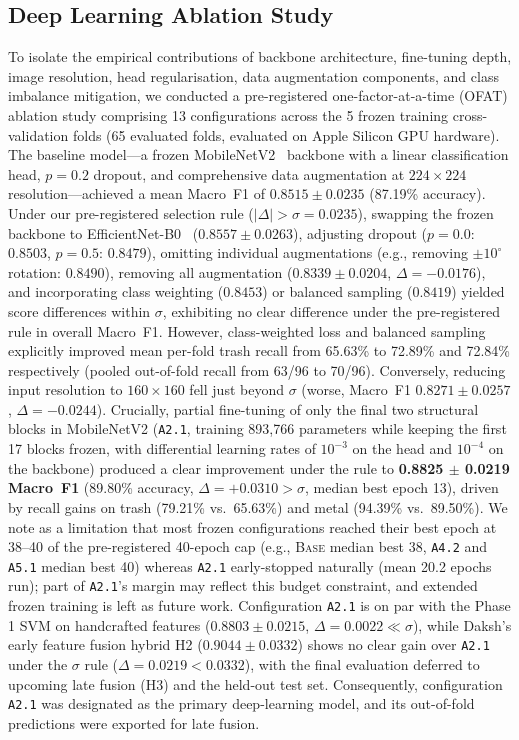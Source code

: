 \subsection{Deep Learning Ablation Study}
\label{sec:dl_ablations}
To isolate the empirical contributions of backbone architecture, fine-tuning depth, image resolution, head regularisation, data augmentation components, and class imbalance mitigation, we conducted a pre-registered one-factor-at-a-time (OFAT) ablation study comprising 13 configurations across the 5 frozen training cross-validation folds (65 evaluated folds, evaluated on Apple Silicon GPU hardware).
The baseline model---a frozen MobileNetV2~\cite{sandler2018mobilenetv2} backbone with a linear classification head, $p=0.2$ dropout, and comprehensive data augmentation at $224 \times 224$ resolution---achieved a mean Macro~F1 of $0.8515 \pm 0.0235$ (87.19\% accuracy).
Under our pre-registered selection rule ($|\Delta| > \sigma = 0.0235$), swapping the frozen backbone to EfficientNet-B0~\cite{tan2019efficientnet} ($0.8557 \pm 0.0263$), adjusting dropout ($p=0.0$: $0.8503$, $p=0.5$: $0.8479$), omitting individual augmentations (e.g., removing $\pm 10^\circ$ rotation: $0.8490$), removing all augmentation ($0.8339 \pm 0.0204$, $\Delta = -0.0176$), and incorporating class weighting ($0.8453$) or balanced sampling ($0.8419$) yielded score differences within $\sigma$, exhibiting no clear difference under the pre-registered rule in overall Macro~F1.
However, class-weighted loss and balanced sampling explicitly improved mean per-fold trash recall from 65.63\% to 72.89\% and 72.84\% respectively (pooled out-of-fold recall from 63/96 to 70/96).
Conversely, reducing input resolution to $160 \times 160$ fell just beyond $\sigma$ (worse, Macro~F1 $0.8271 \pm 0.0257$, $\Delta = -0.0244$).
Crucially, partial fine-tuning of only the final two structural blocks in MobileNetV2 (\texttt{A2.1}, training 893,766 parameters while keeping the first 17 blocks frozen, with differential learning rates of $10^{-3}$ on the head and $10^{-4}$ on the backbone) produced a clear improvement under the rule to \textbf{0.8825 $\pm$ 0.0219 Macro~F1} (89.80\% accuracy, $\Delta = +0.0310 > \sigma$, median best epoch 13), driven by recall gains on trash (79.21\% vs.\ 65.63\%) and metal (94.39\% vs.\ 89.50\%).
We note as a limitation that most frozen configurations reached their best epoch at 38--40 of the pre-registered 40-epoch cap (e.g., \textsc{Base} median best 38, \texttt{A4.2} and \texttt{A5.1} median best 40) whereas \texttt{A2.1} early-stopped naturally (mean 20.2 epochs run); part of \texttt{A2.1}'s margin may reflect this budget constraint, and extended frozen training is left as future work.
Configuration \texttt{A2.1} is on par with the Phase 1 SVM on handcrafted features ($0.8803 \pm 0.0215$, $\Delta = 0.0022 \ll \sigma$), while Daksh's early feature fusion hybrid H2 ($0.9044 \pm 0.0332$) shows no clear gain over \texttt{A2.1} under the $\sigma$ rule ($\Delta = 0.0219 < 0.0332$), with the final evaluation deferred to upcoming late fusion (H3) and the held-out test set.
Consequently, configuration \texttt{A2.1} was designated as the primary deep-learning model, and its out-of-fold predictions were exported for late fusion.

